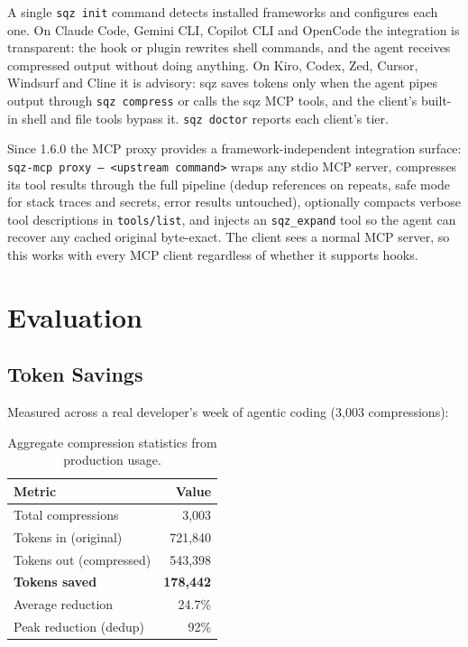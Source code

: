 \documentclass[10pt,twocolumn]{article}
\begin{document}
A single \texttt{sqz init} command detects installed frameworks and configures each one. On Claude Code, Gemini CLI, Copilot CLI and OpenCode the integration is transparent: the hook or plugin rewrites shell commands, and the agent receives compressed output without doing anything. On Kiro, Codex, Zed, Cursor, Windsurf and Cline it is advisory: sqz saves tokens only when the agent pipes output through \texttt{sqz compress} or calls the sqz MCP tools, and the client's built-in shell and file tools bypass it. \texttt{sqz doctor} reports each client's tier.

Since 1.6.0 the MCP proxy provides a framework-independent integration surface: \texttt{sqz-mcp proxy -- <upstream command>} wraps any stdio MCP server, compresses its tool results through the full pipeline (dedup references on repeats, safe mode for stack traces and secrets, error results untouched), optionally compacts verbose tool descriptions in \texttt{tools/list}, and injects an \texttt{sqz\_expand} tool so the agent can recover any cached original byte-exact. The client sees a normal MCP server, so this works with every MCP client regardless of whether it supports hooks.

\section{Evaluation}

\subsection{Token Savings}

Measured across a real developer's week of agentic coding (3,003 compressions):

\begin{table}[h]
\centering
\small
\begin{tabular}{@{}lr@{}}
\toprule
\textbf{Metric} & \textbf{Value} \\
\midrule
Total compressions & 3,003 \\
Tokens in (original) & 721,840 \\
Tokens out (compressed) & 543,398 \\
\textbf{Tokens saved} & \textbf{178,442} \\
Average reduction & 24.7\% \\
Peak reduction (dedup) & 92\% \\
\bottomrule
\end{tabular}
\caption{Aggregate compression statistics from production usage.}
\label{tab:stats}
\end{table}
\end{document}
